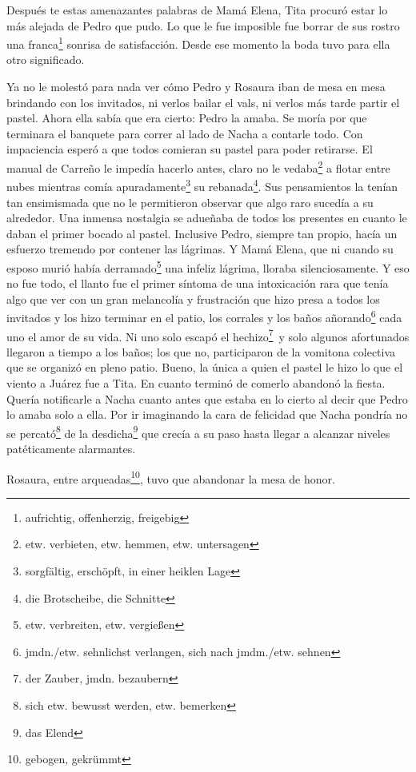 Después te estas amenazantes palabras de Mamá Elena, Tita procuró estar
lo más alejada de Pedro que pudo. Lo que le fue imposible fue borrar de
sus rostro una franca\footnote{aufrichtig, offenherzig, freigebig}
sonrisa de satisfacción. Desde ese momento la boda tuvo para ella otro
significado.

Ya no le molestó para nada ver cómo Pedro y Rosaura iban de mesa en
mesa brindando con los invitados, ni verlos bailar el vals, ni verlos
más tarde partir el pastel. Ahora ella sabía que era cierto: Pedro la
amaba. Se moría por que terminara el banquete para correr al lado de
Nacha a contarle todo. Con impaciencia esperó a que todos comieran su
pastel para poder retirarse. El manual de Carreño le impedía hacerlo
antes, claro no le vedaba\footnote{etw. verbieten, etw. hemmen, etw. untersagen}
a flotar entre nubes mientras comía apuradamente\footnote{sorgfältig, erschöpft, in einer heiklen Lage}
su rebanada\footnote{die Brotscheibe, die Schnitte}. Sus
pensamientos la tenían tan ensimismada que no le permitieron observar
que algo raro sucedía a su alrededor. Una inmensa nostalgia se adueñaba
de todos los presentes en cuanto le daban el primer bocado al pastel.
Inclusive Pedro, siempre tan propio, hacía un esfuerzo tremendo por
contener las lágrimas. Y Mamá Elena, que ni cuando su esposo murió
había derramado\footnote{etw. verbreiten, etw. vergießen}
una infeliz lágrima, lloraba silenciosamente. Y eso no fue todo, el
llanto fue el primer síntoma de una intoxicación rara que tenía algo que
ver con un gran melancolía y frustración que hizo presa a todos los
invitados y los hizo terminar en el patio, los corrales y los baños añorando\footnote{jmdn./etw. sehnlichst verlangen, sich nach jmdm./etw. sehnen}
cada uno el amor de su vida.
Ni uno solo escapó el hechizo\footnote{der Zauber, jmdn. bezaubern}~y solo algunos afortunados llegaron a tiempo a los baños; los que no,
participaron de la vomitona colectiva que se organizó en pleno patio.
Bueno, la única a quien el pastel le hizo lo que el viento a Juárez
fue a Tita. En cuanto terminó de comerlo abandonó la fiesta. Quería
notificarle a Nacha cuanto antes que estaba en lo cierto al decir que
Pedro lo amaba solo a ella. Por ir imaginando la cara de felicidad
que Nacha pondría no se percató\footnote{sich etw. bewusst werden, etw. bemerken}
de la desdicha\footnote{das Elend} que crecía a su paso
hasta llegar a alcanzar niveles patéticamente alarmantes.

Rosaura, entre arqueadas\footnote{gebogen, gekrümmt}, tuvo que
abandonar la mesa de honor.

